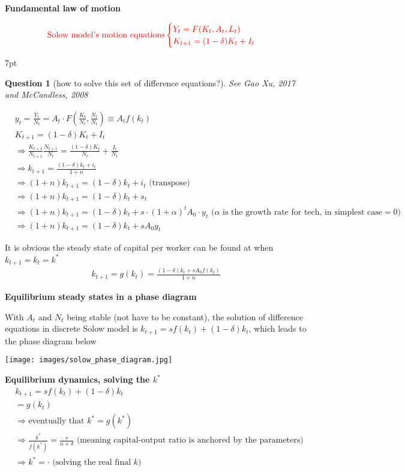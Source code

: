 \documentclass{article}
\newenvironment{redblock}{
\def\FrameCommand{
  \hspace{1pt}
    {\color{LightCoral}
    \vrule width 2pt}
    {\color{redshade}
    \vrule width 4pt}
  \colorbox{redshade}
}
\MakeFramed{
  \advance
  \hsize-
  \width
  \FrameRestore}
\noindent\hspace{-4.55pt}%
\begin{adjustwidth}{}{7pt}
\vspace{2pt}\vspace{2pt}
}
{\vspace{2pt}\end{adjustwidth}\endMakeFramed}
\newtheorem{question}{Question}
\begin{document}
\textbf{Fundamental law of motion} 

\begin{align}
\color{red}
\text{Solow model's motion equations}\begin{cases}Y_{t}=F(K_{t},A_{t},L_{t}) \\
K_{t+1}=(1-\delta)K_{t}+I_{t} \\
\end{cases}
\end{align}

\begin{redblock}
\begin{question}[how to solve this set of difference equations?] 
See Gao Xu, 2017 and McCandless, 2008
\end{question}
\begin{align}
&y_t=\frac{Y_t}{N_t}=A_t \cdot F(\frac{K_t}{N_t},\frac{N_t}{N_t})\equiv A_t f(k_t)
\\&K_{t+1}=(1-\delta)K_t+I_t 
\\&\Rightarrow \frac{K_{t+1}}{N_{t+1}}\frac{N_{t+1}}{N_t}=\frac{(1-\delta)K_t}{N_t}+\frac{I_t}{N_t}
\\&\Rightarrow k_{t+1}=\frac{(1-\delta)k_t +i_t}{1+n}
\\&\Rightarrow (1+n)k_{t+1}=(1-\delta)k_t+i_t \text{ (transpose)}
\\&\Rightarrow(1+n)k_{t+1}=(1-\delta)k_t+s_t
\\&\Rightarrow(1+n)k_{t+1}=(1-\delta)k_t+s\cdot (1+\alpha)^t A_0 \cdot y_t \text{ ($\alpha$ is the growth rate for tech, in simplest case$=0$)}
\\&\Rightarrow(1+n)k_{t+1}=(1-\delta)k_t+s A_0 y_t
\end{align}

It is obvious the steady state of capital per worker can be found at when $k_{t+1}=k_t=k^*$
\begin{align}
k_{t+1}=g(k_t)=\frac{(1-\delta)k_t+s A_0 f(k_t)}{1+n}
\end{align}
\end{redblock}

\textbf{Equilibrium steady states in a phase diagram} 

With $A_{t}$ and $N_{t}$ being stable (not have to be constant), the solution of difference equations in discrete Solow model is $k_{t+1}=sf(k_{t})+(1-\delta)k_{t}$, which leads to the phase diagram below 

\texttt{[image: images/solow\_phase\_diagram.jpg]}


\textbf{Equilibrium dynamics, solving the $k^{*}$} 
\begin{align}
&k_{t+1}=sf(k_{t})+(1-\delta)k_{t}
\\&=g(k_{t})
\\&\Rightarrow \text{eventually that } k^{*}=g(k^{*})
\\& \Rightarrow \frac{k^{*}}{f(k^{*})}=\frac{s}{n+\delta} \text{ (meaning capital-output ratio is anchored by the parameters)}
\\&\Rightarrow k^{*}=\cdot \text{ (solving the real final } k \text{)}
\end{align}
\end{document}
